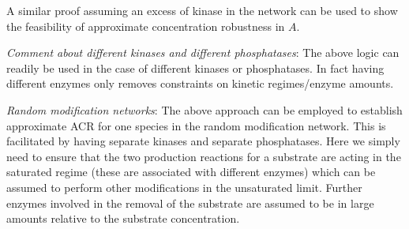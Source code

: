 \documentclass[9pt,lineno]{elife}
\begin{document}
\begin{appendixbox}



A similar proof assuming an excess of kinase in the network can be used to show the feasibility of approximate concentration robustness in $A$.


\textit{Comment about different kinases and different phosphatases}: The above logic can readily be used in the case of different kinases or phosphatases. In fact having different enzymes only removes constraints on kinetic regimes/enzyme amounts. 

\textit{Random modification networks}: The above approach can be employed to establish approximate ACR for one species in the random modification network. This is facilitated by having separate kinases and separate phosphatases. Here we simply need to ensure that the two production reactions for a substrate are acting in the saturated regime (these are associated with different enzymes) which can be assumed to perform other modifications in the unsaturated limit. Further enzymes involved in the removal of the substrate are assumed to be in large amounts relative to the substrate concentration.   


\end{appendixbox}
\end{document}
